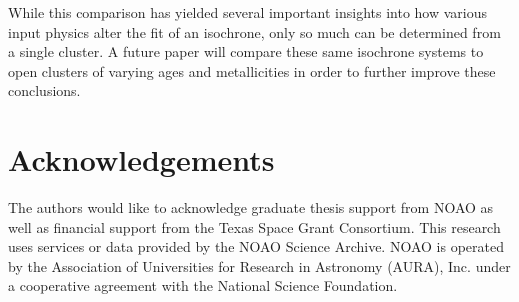 \documentclass[iop]{emulateapj}
\begin{document}
While this comparison has yielded several important insights into how various input physics alter the fit of an isochrone, only so much can be determined from a single cluster. A future paper will compare these same isochrone systems to open clusters of varying ages and metallicities in order to further improve these conclusions.


\section{Acknowledgements}

The authors would like to acknowledge graduate thesis support from NOAO as well as financial support from the Texas Space Grant Consortium. This research uses services or data provided by the NOAO Science Archive. NOAO is operated by the Association of Universities for Research in Astronomy (AURA), Inc. under a cooperative agreement with the National Science Foundation.





\end{document}

